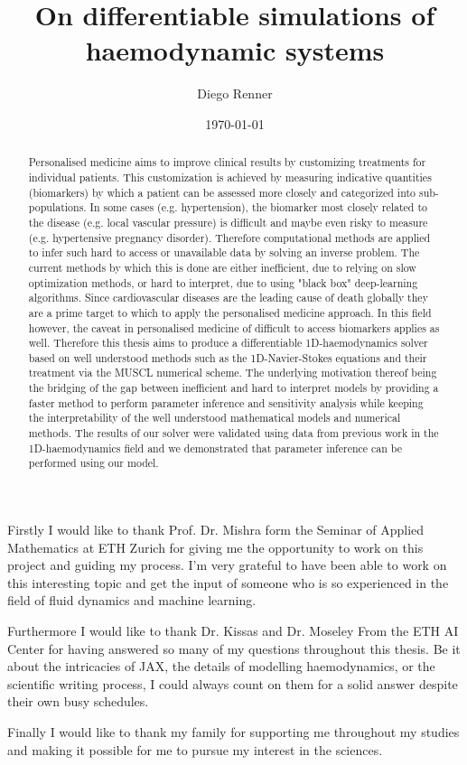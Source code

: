 \documentclass[a4paper, oneside]{discothesis}
\title{On differentiable simulations of haemodynamic systems}
\author{Diego Renner}
\institute{Dep. of Mathematics \\[2pt]
ETH Zürich}
\date{\today}
\begin{document}
\frontmatter %
\maketitle
\cleardoublepage

\begin{acknowledgements}
	Firstly I would like to thank Prof. Dr. Mishra form the Seminar of Applied Mathematics at ETH Zurich for giving me the opportunity to work on this project and guiding my process.	
	I'm very grateful to have been able to work on this interesting topic and get the input of someone who is so experienced in the field of fluid dynamics and machine learning.

	Furthermore I would like to thank Dr. Kissas and Dr. Moseley From the ETH AI Center for having answered so many of my questions throughout this thesis.
	Be it about the intricacies of JAX, the details of modelling haemodynamics, or the scientific writing process, I could always count on them for a solid answer despite their own busy schedules.

	Finally I would like to thank my family for supporting me throughout my studies and making it possible for me to pursue my interest in the sciences.

\end{acknowledgements}


\begin{abstract}
	Personalised medicine aims to improve clinical results by customizing treatments for individual patients.
	This customization is achieved by measuring indicative quantities (biomarkers) by which a patient can be assessed more closely and categorized into sub-populations.
	In some cases (e.g. hypertension), the biomarker most closely related to the disease (e.g. local vascular pressure) is difficult and maybe even risky to measure (e.g. hypertensive pregnancy disorder).
	Therefore computational methods are applied to infer such hard to access or unavailable data by solving an inverse problem.
	The current methods by which this is done are either inefficient, due to relying on slow optimization methods, or hard to interpret, due to using "black box" deep-learning algorithms.
	Since cardiovascular diseases are the leading cause of death globally they are a prime target to which to apply the personalised medicine approach.
	In this field however, the caveat in personalised medicine of difficult to access biomarkers applies as well.
	Therefore this thesis aims to produce a differentiable 1D-haemodynamics solver based on well understood methods such as the 1D-Navier-Stokes equations and their treatment via the MUSCL numerical scheme.
	The underlying motivation thereof being the bridging of the gap between inefficient and hard to interpret models by providing a faster method to perform parameter inference and sensitivity analysis while keeping the interpretability of the well understood mathematical models and numerical methods.
	The results of our solver were validated using data from previous work in the 1D-haemodynamics field and we demonstrated that parameter inference can be performed using our model.

\end{abstract}
\end{document}
